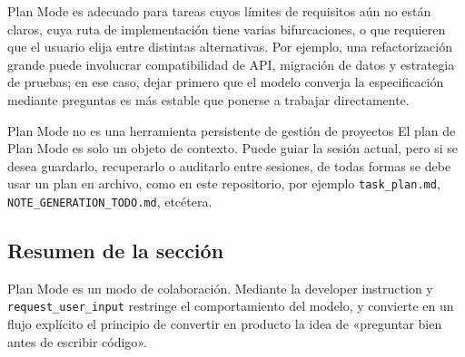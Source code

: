 Plan Mode es adecuado para tareas cuyos límites de requisitos aún no están claros, cuya ruta de implementación tiene varias bifurcaciones, o que requieren que el usuario elija entre distintas alternativas. Por ejemplo, una refactorización grande puede involucrar compatibilidad de API, migración de datos y estrategia de pruebas; en ese caso, dejar primero que el modelo converja la especificación mediante preguntas es más estable que ponerse a trabajar directamente.

\begin{warningbox}{Plan Mode no es una herramienta persistente de gestión de proyectos}
El plan de Plan Mode es solo un objeto de contexto. Puede guiar la sesión actual, pero si se desea guardarlo, recuperarlo o auditarlo entre sesiones, de todas formas se debe usar un plan en archivo, como en este repositorio, por ejemplo \texttt{task\_plan.md}, \texttt{NOTE\_GENERATION\_TODO.md}, etcétera.
\end{warningbox}

\subsection{Resumen de la sección}

Plan Mode es un modo de colaboración. Mediante la developer instruction y \texttt{request\_user\_input} restringe el comportamiento del modelo, y convierte en un flujo explícito el principio de convertir en producto la idea de «preguntar bien antes de escribir código».

